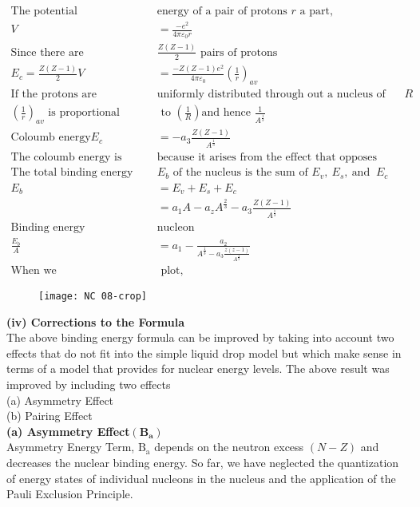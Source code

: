 \begin{align*}
\text{The potential }&\text{energy of a pair of protons $r$ a part,}\\
V&=\frac{-e^2}{4\pi\varepsilon_0 r}\\
\text{Since there are  }&\text{$\frac{Z(Z-1)}{2}$ pairs of protons}\\
E_c=\frac{Z(Z-1)}{2}V&=\frac{-Z(Z-1)e^2}{4\pi\varepsilon_0}\left( \frac{1}{r}\right)_{av}\\
\text{If the protons are }&\text{uniformly distributed through out a nucleus of radius $R$}\\
\text{$\left( \frac{1}{r}\right)_{av}$ is proportional}&\text{ to $\left( \frac{1}{R}\right)$and hence $\frac{1}{A^\frac{1}{3}}$}\\
\text{Coloumb energy}E_c&=-a_3\frac{Z(Z-1)}{A^\frac{1}{3}}\\
\text{The coloumb energy is negative }&\text{because it arises from the effect that opposes nuclear stability.}\\
\text{The total binding energy }&\text{$E_b$ of the nucleus is the sum of $E_v,\ E_s,\ $and $\ E_c$ }\\
E_b&=E_v+E_s+E_c\\
&=a_1A-a_zA^\frac{2}{3}-a_3\frac{Z(Z-1)}{A^\frac{1}{3}}\\
\text{Binding energy }&\text{nucleon}\\
\frac{E_b}{A}&=a_1-\frac{a_2}{A^\frac{1}{3}-a_3\frac{z(z-1)}{A^\frac{4}{3}}}\\
\text{When we}&\text{ plot,}
\end{align*}
\begin{figure}[H]
	\centering
	\texttt{[image: NC 08-crop]}
\end{figure}
\textbf{(iv) Corrections to the Formula}\\
The above binding energy formula can be improved by taking into account two effects that do not fit into the simple liquid drop model but which make sense in terms of a model that provides for nuclear energy levels. The above result was improved by including two effects\\
(a) Asymmetry Effect\\
(b) Pairing Effect\\
\textbf{(a) Asymmetry Effect$\mathbf{\left(B_a\right)}$}\\
Asymmetry Energy Term, $\mathrm{B}_{\mathrm{a}}$ depends on the neutron excess $(N-Z)$ and decreases the nuclear binding energy. So far, we have neglected the quantization of energy states of individual nucleons in the nucleus and the application of the Pauli Exclusion Principle.
